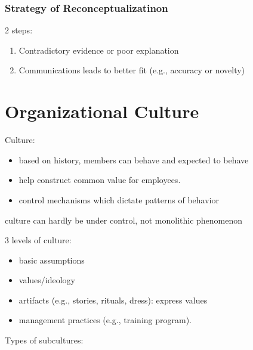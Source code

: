 \documentclass[
]{book}
\providecommand{\tightlist}{%
  \setlength{\itemsep}{0pt}\setlength{\parskip}{0pt}}
\begin{document}
\hypertarget{strategy-of-reconceptualizatinon}{%
\subsection{Strategy of Reconceptualizatinon}\label{strategy-of-reconceptualizatinon}}

2 steps:

\begin{enumerate}
\def\labelenumi{\arabic{enumi}.}
\tightlist
\item
  Contradictory evidence or poor explanation\\
\item
  Communications leads to better fit (e.g., accuracy or novelty)
\end{enumerate}

\hypertarget{organizational-culture}{%
\chapter{Organizational Culture}\label{organizational-culture}}

\citep{Martin_1983}

Culture:

\begin{itemize}
\tightlist
\item
  based on history, members can behave and expected to behave\\
\item
  help construct common value for employees.\\
\item
  control mechanisms which dictate patterns of behavior
\end{itemize}

culture can hardly be under control, not monolithic phenomenon

3 levels of culture:

\begin{itemize}
\tightlist
\item
  basic assumptions\\
\item
  values/ideology\\
\item
  artifacts (e.g., stories, rituals, dress): express values\\
\item
  management practices (e.g., training program).
\end{itemize}

Types of subcultures:
\end{document}
